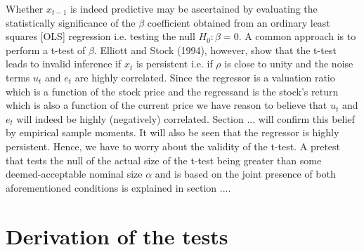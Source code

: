\documentclass{article}
\begin{document}
Whether $x_{t-1}$ is indeed predictive may be ascertained by evaluating the statistically significance of the $\beta$ coefficient obtained from an ordinary least squares [OLS] regression i.e. testing the null $H_0: \beta = 0$. A common approach is to perform a t-test of $\beta$. Elliott and Stock (1994), however, show that the t-test leads to invalid inference if $x_{t}$ is persistent i.e. if $\rho$ is close to unity and the noise terms $u_{t}$ and $e_{t}$ are highly correlated. Since the regressor is a valuation ratio which is a function of the stock price and the regressand is the stock's return which is also a function of the current price we have reason to believe that $u_{t}$ and $e_{t}$ will indeed be highly (negatively) correlated. Section ... will confirm this belief by empirical sample moments. It will also be seen that the regressor is highly persistent. Hence, we have to worry about the validity of the t-test. A pretest that tests the null of the actual size of the t-test being greater than some deemed-acceptable nominal size $\alpha$ and is based on the joint presence of both aforementioned conditions is explained in section ....

\section{Derivation of the tests}
\end{document}
